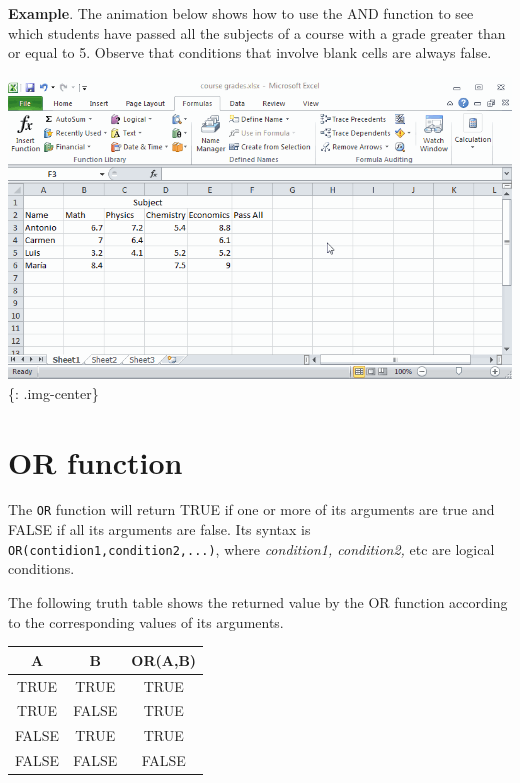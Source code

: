\textbf{Example}. The animation below shows how to use the AND function to see which students have passed all the subjects of a course with a grade greater than or equal to 5. Observe that conditions that involve blank cells are always false. 

\includegraphics[keepaspectratio,width=\textwidth,height=0.75\textheight]{img/example_function_and.gif}
\{: .img-center\}

\section{OR function}
\label{orfunction}

The \texttt{OR} function will return TRUE if one or more of its arguments are true and FALSE if all its arguments are false. Its syntax is \texttt{OR(contidion1,condition2,...)}, where \emph{condition1, condition2,} etc are logical conditions. 

The following truth table shows the returned value by the OR function according to the corresponding values of its arguments.

\begin{table}[htbp]
\begin{minipage}{\linewidth}
\setlength{\tymax}{0.5\linewidth}
\centering
\small
\begin{tabulary}{\textwidth}{@{}CCC@{}} \toprule
A&B&OR(A,B)\\
\midrule
TRUE&TRUE&TRUE\\
TRUE&FALSE&TRUE\\
FALSE&TRUE&TRUE\\
FALSE&FALSE&FALSE\\

\bottomrule

\end{tabulary}
\end{minipage}
\end{table}




